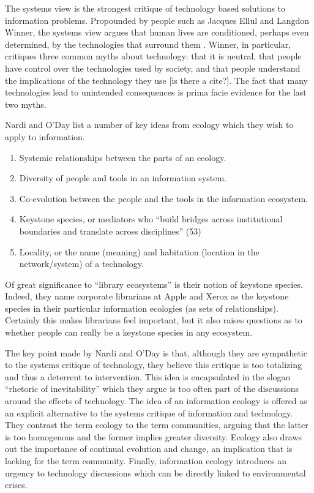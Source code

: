 The systems view is the strongest critique of technology based solutions to information problems. Propounded by people such as Jacques Ellul and Langdon Winner, the systems view argues that human lives are conditioned, perhaps even determined, by the technologies that surround them \citep{ellul_technological_1964, winner_autonomous_1977}. Winner, in particular, critiques three common myths about technology: that it is neutral, that people have control over the technologies used by society, and that people understand the implications of the technology they use\citep[ch. 4]{nardi_information_1999} [is there a cite?]. The fact that many technologies lead to unintended consequences is prima facie evidence for the last two myths.

Nardi and O'Day list a number of key ideas from ecology which they wish to apply to information.

\begin{enumerate}
\item Systemic relationships between the parts of an ecology.
\item Diversity of people and tools in an information system.
\item Co-evolution between the people and the tools in the information ecosystem.
\item Keystone species, or mediators who ``build bridges across institutional boundaries and translate across disciplines'' (53)
\item Locality, or the name (meaning) and habitation (location in the network/system) of a technology.
\end{enumerate}

Of great significance to ``library ecosystems'' is their notion of keystone species. Indeed, they name corporate librarians at Apple and Xerox as the keystone species in their particular information ecologies (as sets of relationships). Certainly this makes librarians feel important, but it also raises questions as to whether people can really be a keystone species in any ecosystem.

The key point made by Nardi and O'Day is that, although they are sympathetic to the systems critique of technology, they believe this critique is too totalizing and thus a deterrent to intervention. This idea is encapsulated in the slogan ``rhetoric of inevitability'' which they argue is too often part of the discussions around the effects of technology. The idea of an information ecology is offered as an explicit alternative to the systems critique of information and technology. They contrast the term ecology to the term communities, arguing that the latter is too homogenous and the former implies greater diversity. Ecology also draws out the importance of continual evolution and change, an implication that is lacking for the term community.  Finally, information ecology introduces an urgency to technology discussions which can be directly linked to environmental crises.

